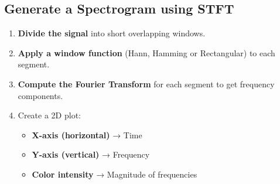 \documentclass[a4paper,12pt]{article}
\begin{document}
\subsection{Generate a Spectrogram using STFT}
    \begin{enumerate}
        \item \textbf{Divide the signal} into short overlapping windows.
        \item \textbf{Apply a window function} (Hann, Hamming or Rectangular) to each segment.
        \item \textbf{Compute the Fourier Transform} for each segment to get frequency components.
        \item Create a 2D plot:
            \begin{itemize}
                \item \textbf{X-axis (horizontal)} → Time
                \item \textbf{Y-axis (vertical)} → Frequency
                \item \textbf{Color intensity} → Magnitude of frequencies
            \end{itemize}
    \end{enumerate}
\end{document}
